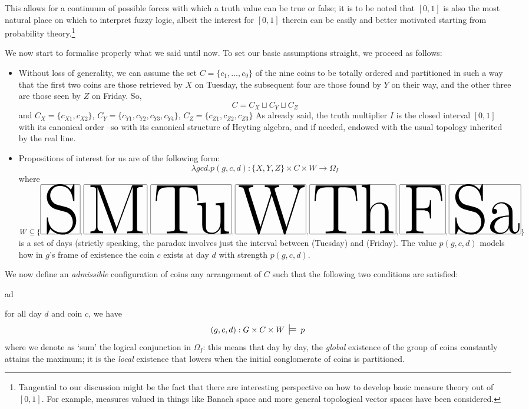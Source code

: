 \begin{example}
\begin{remark}
		This allows for a continuum of possible forces with which a truth value can be true or false;  it is to be noted that $[0,1]$ is also the most natural place on which to interpret fuzzy logic, albeit the interest for $[0,1]$ therein can be easily and better motivated starting from probability theory.\footnote{Tangential to our discussion might be the fact that there are interesting perspective on how to develop basic measure theory out of $[0,1]$. For example, measures valued in things like Banach space and more general topological  vector spaces have been considered.}
	\end{remark}
	We now start to formalise properly what we said until now. To set our basic assumptions straight, we proceed as follows:
	\begin{itemize}
		\item Without loss of generality, we can assume the set $C = \{c_1,\dots,c_9\}$ of the nine coins to be totally ordered and partitioned in such a way that the first two coins are those retrieved by $X$ on Tuesday, the subsequent four are those found by $Y$ on their way, and the other three are those seen by $Z$ on Friday. So,
		      \[C = C_X \sqcup C_Y \sqcup C_Z\]
		      and $C_X = \{c_{X1}, c_{X2}\}$, $C_Y = \{c_{Y1},c_{Y2},c_{Y3},c_{Y4}\}$, $C_Z= \{c_{Z1}, c_{Z2}, c_{Z3}\}$ As already said, the truth multiplier $I$ is the closed interval $[0,1]$ with its canonical order --so with its canonical structure of Heyting algebra, and if needed, endowed with the usual topology inherited by the real line.
		\item Propositions of interest for us are of the following form:
		      \[\lambda gcd.p(g, c, d) : \{X,Y,Z\}\times C\times W \to \Omega_I\]
		      where $W \subseteq \{\S,\M,\Tu,\W, \Th,\F,\Sa\}$ is a set of days (strictly speaking, the paradox involves just the interval between \Tu (Tuesday) and \F (Friday). The value $p(g,c,d)$ models how in $g$'s frame of existence the coin $c$ exists at day $d$ with strength $p(g,c,d)$.
	\end{itemize}
	\begin{definition}
		We now define an \emph{admissible} configuration of coins any arrangement of $C$ such that the following two conditions are satisfied:
		\begin{enumtag}{ad}
			\item \label{ad:uno} for all day $d$ and coin $c$, we have
			\[
				(g,c,d) : G\times C\times W \entails{} p
			\]
			where we denote as `sum' the logical conjunction in $\Omega_I$: this means that day by day, the \emph{global} existence of the group of coins constantly attains the maximum; it is the \emph{local} existence that lowers when the initial conglomerate of coins is partitioned.

\end{enumtag}
\end{definition}
\end{example}
